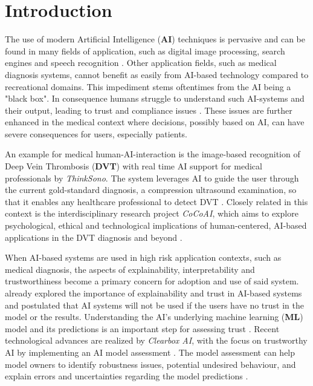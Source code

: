 \documentclass[11pt,a4paper,english]{scrreprt}
\begin{document}

\setlength{\parindent}{0em}
\setlength{\parskip}{1em}


\tableofcontents

\newpage
{}
\chapter{Introduction}
The use of modern Artificial Intelligence (\textbf{AI}) techniques is pervasive and can be found in many fields of application, such as digital image processing, search engines and speech recognition \parencite{eu_com_ai}. Other application fields, such as medical diagnosis systems, cannot benefit as easily from AI-based technology compared to recreational domains. This impediment stems oftentimes from the AI being a "black box". In consequence humans struggle to understand such AI-systems and their output, leading to trust and compliance issues \parencite{adadi_blackbox_2018}. These issues are further enhanced in the medical context where decisions, possibly based on AI, can have severe consequences for users, especially patients.

An example for medical human-AI-interaction is the image-based recognition of Deep Vein Thrombosis (\textbf{DVT}) with real time AI support for medical professionals by \textit{Think\-Sono}. The system leverages AI to guide the user through the current gold-standard diagnosis, a compression ultrasound examination, so that it enables any healthcare professional to detect DVT \parencite{thinksono_website}. Closely related in this context is the interdisciplinary research project \textit{CoCoAI}, which aims to explore psychological, ethical and technological implications of human-centered, AI-based applications in the DVT diagnosis and beyond \parencite{cocoai_website}. 

When AI-based systems are used in high risk application contexts, such as medical diagnosis, the aspects of explainability, interpretability and trustworthiness become a primary concern for adoption and use of said system. \textcite{ribeiro_why_2016} already explored the importance of explainability and trust in AI-based systems and postulated that AI systems will not be used if the users have no trust in the model or the results. Understanding the AI's underlying machine learning (\textbf{ML}) model and its predictions is an important step for assessing trust \parencite{ribeiro_why_2016}. Recent technological advances are realized by \textit{Clearbox AI}, with the focus on trustworthy AI by implementing an AI model assessment \parencite{clearbox_website, eu_trustworthy_ai}. The model assessment can help model owners to identify robustness issues, potential undesired behaviour, and explain errors and uncertainties regarding the model predictions \parencite{clearbox_wp}.
\end{document}
